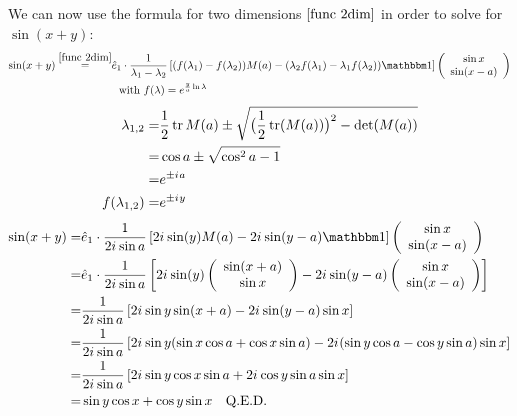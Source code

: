 \documentclass{article}
\renewcommand{\i}{{i\mkern1mu}}
\begin{document}
We can now use the formula for two dimensions $\eqref{func 2dim}$ in order to solve for $\sin(x+y)$:
\begin{align}
\sin(x+y) \overset{\eqref{func 2dim}}=& \hat e_1 \cdot \frac 1{\lambda_1 - \lambda_2} \left[(f(\lambda_1) - f(\lambda_2))M(a) - (\lambda_2 f(\lambda_1) - \lambda_1 f(\lambda_2)) \mathbbm 1\right] \left(\begin{array}{c} \sin x \\ \sin(x-a) \end{array}\right) \nonumber\\
&\ \ \text{with}\ f(\lambda) = e^{\frac ya \ln\lambda}
\end{align}
\begin{align}
\lambda_{1,2} =& \frac 12\tr M(a) \pm \sqrt{\big(\frac 12\tr (M(a))\big)^2 - \det(M(a))}\nonumber\\
=& \cos a \pm \sqrt{\cos^2 a - 1}\nonumber\\
=& e^{\pm \i a}\\
f(\lambda_{1,2}) =& e^{\pm \i y}
\end{align}
\begin{align}
\sin(x+y) =& \hat e_1 \cdot \frac 1{2\i \sin a} \left[2\i \sin(y) M(a) - 2\i \sin(y - a) \mathbbm 1\right] \left(\begin{array}{c} \sin x \\ \sin(x-a) \end{array}\right) \nonumber\\
=& \hat e_1 \cdot \frac 1{2\i \sin a} \left[2\i \sin(y)  \left(\begin{array}{c} \sin(x+a) \\ \sin x \end{array}\right) - 2\i \sin(y - a) \left(\begin{array}{c} \sin x \\ \sin(x-a) \end{array}\right) \right] \nonumber\\
=& \frac 1{2\i \sin a} \left[2\i \sin y \sin(x+a) - 2\i \sin(y - a) \sin x \right] \nonumber\\
=& \frac 1{2\i \sin a} \left[2\i \sin y (\sin x \cos a + \cos x \sin a) - 2\i (\sin y \cos a - \cos y \sin a) \sin x \right] \nonumber\\
=& \frac 1{2\i \sin a} \left[2\i \sin y \cos x \sin a + 2\i \cos y \sin a \sin x \right] \nonumber\\
=& \sin y \cos x + \cos y \sin x\ \ \ \text{Q.E.D.}
\end{align}

\end{document}
